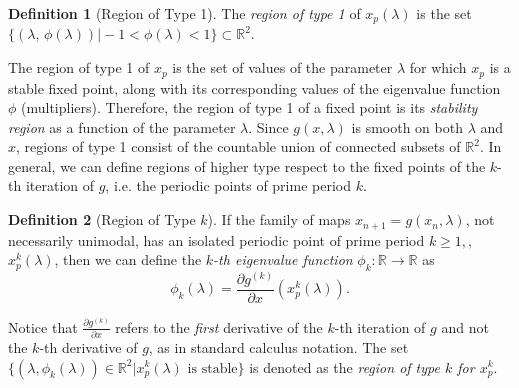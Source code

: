 \documentclass[10pt,twoside,titlepage]{book}
\numberwithin{equation}{chapter}
\numberwithin{figure}{chapter}
\numberwithin{table}{chapter}
\theoremstyle{plain}%
\theoremstyle{definition}
\newtheorem{defn}{Definition}[chapter]
\theoremstyle{remark}
\begin{document}
\begin{defn}[Region of Type 1]
	The \emph{region of type 1} of $x_{p}(\lambda)$ is the set $\{(\lambda,\,\phi(\lambda))\vert-1<\phi(\lambda)<1\}\subset\mathbb{R}^{2}$.
\end{defn}

The region of type 1 of $x_{p}$ is the set of values of the parameter $\lambda$ for which $x_{p}$ is a stable fixed point, along with its corresponding values of the eigenvalue function $\phi$ (multipliers). Therefore, the region of type 1 of a fixed point is its \emph{stability region} as a function of the parameter $\lambda$. Since $g(x,\lambda)$ is smooth on both $\lambda$ and $x$, regions of type 1 consist of the countable union of connected subsets of $\mathbb{R}^2$. In general, we can define regions of higher type respect to the fixed points of the $k$-th iteration of $g$, i.e. the periodic points of prime period $k$.

\begin{defn}[Region of Type $k$]
	If the family of maps $x_{n+1}=g(x_{n},\lambda)$, not necessarily unimodal, has an isolated periodic point of prime period $k\geq1,$, $x_{p}^{k}(\lambda)$, then we can define the \emph{$k$-th eigenvalue function} $\phi_{k}:\mathbb{R}\rightarrow\mathbb{R}$ as
	\begin{equation}
		\phi_{k}(\lambda)=\frac{\partial g^{(k)}}{\partial x}(x_{p}^{k}(\lambda)).\label{eq:EigenvalueFunctionKth}
	\end{equation}
	
	Notice that $\frac{\partial g^{(k)}}{\partial x}$ refers to the \emph{first} derivative of the $k$-th iteration of $g$ and not the $k$-th derivative of $g$, as in standard calculus notation. The set $\{(\lambda,\phi_{k}(\lambda))\in\mathbb{R}^{2}\vert x_{p}^{k}(\lambda)\text{ is stable}\}$ is denoted as the \emph{region of type $k$ for $x_{p}^{k}$}.
\end{defn}
\end{document}
